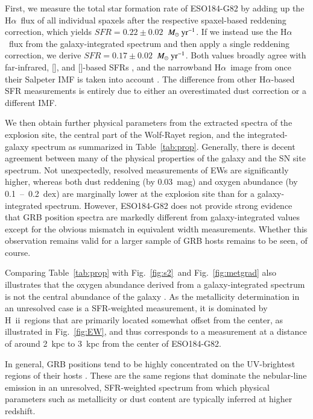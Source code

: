 \documentclass[traditabstract]{aa}
\newcommand{\ha}{H$\alpha$}
\newcommand{\hii}{\mbox{H~{\sc ii}}}
\newcommand{\oi}{[\ion{O}{i}]}
\newcommand{\cii}{[\ion{C}{ii}]}
\newcommand{\Msunyr}{$M_\odot~\rm{yr}^{-1}$}
\begin{document}
First, we measure the total star formation rate of ESO184-G82 by adding up the \ha~flux of all individual spaxels after the respective spaxel-based reddening correction, which yields $SFR=0.22\pm0.02$~\Msunyr. If we instead use the \ha~flux from the galaxy-integrated spectrum and then apply a single reddening correction, we derive $SFR=0.17\pm0.02$~\Msunyr. Both values broadly agree with far-infrared, \oi, and \cii-based SFRs \citep{2014A&A...562A..70M, 2016arXiv160901742M}, and the narrowband \ha~image from \citet{2005NewA...11..103S} once their Salpeter IMF is taken into account \citep[see also][]{2009ApJ...691..182S}. The difference from other \ha-based SFR measurements \citep{2006A&A...454..103H, 2008A&A...490...45C} is entirely due to either an overestimated dust correction or a different IMF.

We then obtain further physical parameters from the extracted spectra of the explosion site, the central part of the Wolf-Rayet region, and the integrated-galaxy spectrum as summarized in Table~\ref{tab:prop}. Generally, there is decent agreement between many of the physical properties of the galaxy and the SN site spectrum. Not unexpectedly, resolved measurements of EWs are significantly higher, whereas both dust reddening (by 0.03~mag) and oxygen abundance (by 0.1~--~0.2~dex) are marginally lower at the explosion site than for a galaxy-integrated spectrum. However, ESO184-G82 does not provide strong evidence that GRB position spectra are markedly different from galaxy-integrated values except for the obvious mismatch in equivalent width measurements. Whether this observation remains valid for a larger sample of GRB hosts remains to be seen, of course.

Comparing Table~\ref{tab:prop} with Fig.~\ref{fig:s2}~and Fig.~\ref{fig:metgrad} also illustrates that the oxygen abundance derived from a galaxy-integrated spectrum is not the central abundance of the galaxy \citep[see also, e.g.,][]{2016A&A...591A..48G}. As the metallicity determination in an unresolved case is a SFR-weighted measurement, it is dominated by \hii\  regions that are primarily located somewhat offset from the center, as illustrated in Fig.~\ref{fig:EW}, and thus corresponds to a measurement at a distance of around 2~kpc to 3~kpc from the center of ESO184-G82. 

{In general, GRB positions tend to be highly concentrated on the UV-brightest regions of their hosts \citep[e.g.,][]{2010MNRAS.405...57S, 2016ApJ...817..144B, 2017MNRAS.tmp..220L}. These are the same regions that dominate the nebular-line emission in an unresolved, SFR-weighted spectrum from which physical parameters such as metallicity or dust content are typically inferred at higher redshift.}
\end{document}
